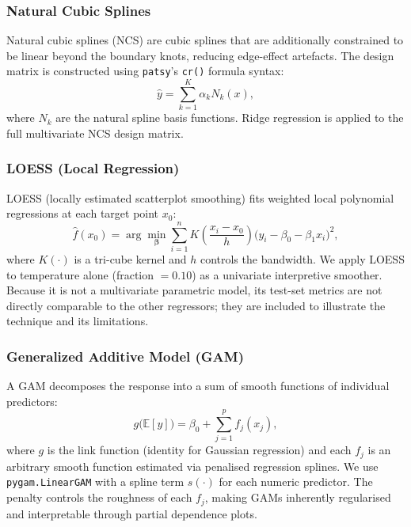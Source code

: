\documentclass[conference]{IEEEtran}
\begin{document}
\subsubsection{Natural Cubic Splines}
Natural cubic splines (NCS) are cubic splines that are additionally
constrained to be linear beyond the boundary knots, reducing edge-effect
artefacts. The design matrix is constructed using \texttt{patsy}'s
\texttt{cr()} formula syntax:
\begin{equation}
  \hat{y} = \sum_{k=1}^{K} \alpha_k N_k(x),
  \label{eq:ncs}
\end{equation}
where $N_k$ are the natural spline basis functions. Ridge regression is
applied to the full multivariate NCS design matrix.

\subsubsection{LOESS (Local Regression)}
LOESS (locally estimated scatterplot smoothing) fits weighted local
polynomial regressions at each target point $x_0$:
\begin{equation}
  \hat{f}(x_0) = \arg\min_{\boldsymbol{\beta}}
    \sum_{i=1}^{n} K\!\left(\frac{x_i - x_0}{h}\right)
    \bigl(y_i - \beta_0 - \beta_1 x_i\bigr)^2,
  \label{eq:loess}
\end{equation}
where $K(\cdot)$ is a tri-cube kernel and $h$ controls the bandwidth. We
apply LOESS to temperature alone (fraction $= 0.10$) as a univariate
interpretive smoother. Because it is not a multivariate parametric model,
its test-set metrics are not directly comparable to the other regressors;
they are included to illustrate the technique and its limitations.

\subsubsection{Generalized Additive Model (GAM)}
A GAM decomposes the response into a sum of smooth functions of individual
predictors:
\begin{equation}
  g\!\bigl(\mathbb{E}[y]\bigr)
    = \beta_0 + \sum_{j=1}^{p} f_j(x_j),
  \label{eq:gam}
\end{equation}
where $g$ is the link function (identity for Gaussian regression) and each
$f_j$ is an arbitrary smooth function estimated via penalised regression
splines. We use \texttt{pygam.LinearGAM} with a spline term $s(\cdot)$ for
each numeric predictor. The penalty controls the roughness of each $f_j$,
making GAMs inherently regularised and interpretable through partial
dependence plots.
\end{document}
